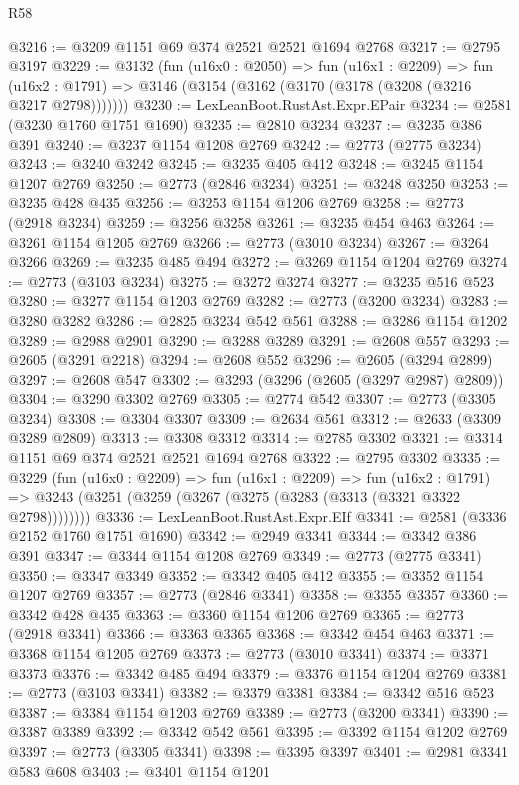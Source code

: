 \begin{lexlean}{R58}
\begin{coremodule}
@3216 := @3209 @1151 @69 @374 @2521 @2521 @1694 @2768
@3217 := @2795 @3197
@3229 := @3132
    (fun (u16x0 : @2050) =>
    fun (u16x1 : @2209) =>
    fun (u16x2 : @1791) => @3146 (@3154 (@3162 (@3170 (@3178 (@3208 (@3216 @3217 @2798)))))))
@3230 := LexLeanBoot.RustAst.Expr.EPair
@3234 := @2581 (@3230 @1760 @1751 @1690)
@3235 := @2810 @3234
@3237 := @3235 @386 @391
@3240 := @3237 @1154 @1208 @2769
@3242 := @2773 (@2775 @3234)
@3243 := @3240 @3242
@3245 := @3235 @405 @412
@3248 := @3245 @1154 @1207 @2769
@3250 := @2773 (@2846 @3234)
@3251 := @3248 @3250
@3253 := @3235 @428 @435
@3256 := @3253 @1154 @1206 @2769
@3258 := @2773 (@2918 @3234)
@3259 := @3256 @3258
@3261 := @3235 @454 @463
@3264 := @3261 @1154 @1205 @2769
@3266 := @2773 (@3010 @3234)
@3267 := @3264 @3266
@3269 := @3235 @485 @494
@3272 := @3269 @1154 @1204 @2769
@3274 := @2773 (@3103 @3234)
@3275 := @3272 @3274
@3277 := @3235 @516 @523
@3280 := @3277 @1154 @1203 @2769
@3282 := @2773 (@3200 @3234)
@3283 := @3280 @3282
@3286 := @2825 @3234 @542 @561
@3288 := @3286 @1154 @1202
@3289 := @2988 @2901
@3290 := @3288 @3289
@3291 := @2608 @557
@3293 := @2605 (@3291 @2218)
@3294 := @2608 @552
@3296 := @2605 (@3294 @2899)
@3297 := @2608 @547
@3302 := @3293 (@3296 (@2605 (@3297 @2987) @2809))
@3304 := @3290 @3302 @2769
@3305 := @2774 @542
@3307 := @2773 (@3305 @3234)
@3308 := @3304 @3307
@3309 := @2634 @561
@3312 := @2633 (@3309 @3289 @2809)
@3313 := @3308 @3312
@3314 := @2785 @3302
@3321 := @3314 @1151 @69 @374 @2521 @2521 @1694 @2768
@3322 := @2795 @3302
@3335 := @3229
    (fun (u16x0 : @2209) =>
    fun (u16x1 : @2209) =>
    fun (u16x2 : @1791) =>
    @3243 (@3251 (@3259 (@3267 (@3275 (@3283 (@3313 (@3321 @3322 @2798))))))))
@3336 := LexLeanBoot.RustAst.Expr.EIf
@3341 := @2581 (@3336 @2152 @1760 @1751 @1690)
@3342 := @2949 @3341
@3344 := @3342 @386 @391
@3347 := @3344 @1154 @1208 @2769
@3349 := @2773 (@2775 @3341)
@3350 := @3347 @3349
@3352 := @3342 @405 @412
@3355 := @3352 @1154 @1207 @2769
@3357 := @2773 (@2846 @3341)
@3358 := @3355 @3357
@3360 := @3342 @428 @435
@3363 := @3360 @1154 @1206 @2769
@3365 := @2773 (@2918 @3341)
@3366 := @3363 @3365
@3368 := @3342 @454 @463
@3371 := @3368 @1154 @1205 @2769
@3373 := @2773 (@3010 @3341)
@3374 := @3371 @3373
@3376 := @3342 @485 @494
@3379 := @3376 @1154 @1204 @2769
@3381 := @2773 (@3103 @3341)
@3382 := @3379 @3381
@3384 := @3342 @516 @523
@3387 := @3384 @1154 @1203 @2769
@3389 := @2773 (@3200 @3341)
@3390 := @3387 @3389
@3392 := @3342 @542 @561
@3395 := @3392 @1154 @1202 @2769
@3397 := @2773 (@3305 @3341)
@3398 := @3395 @3397
@3401 := @2981 @3341 @583 @608
@3403 := @3401 @1154 @1201

\end{coremodule}
\end{lexlean}
